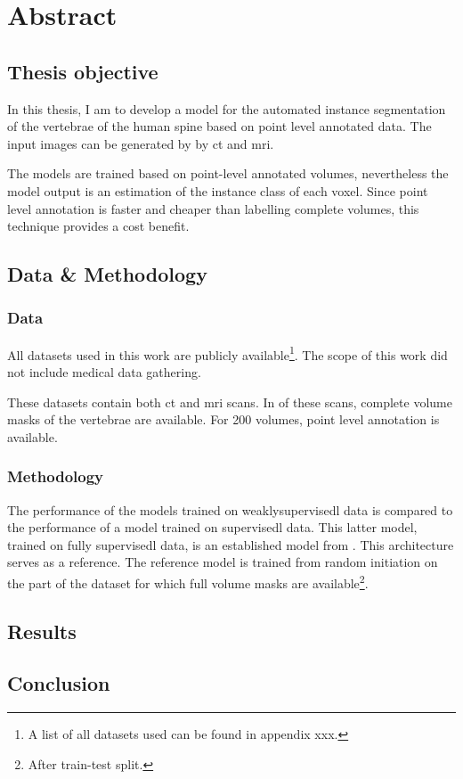 \chapter{Abstract}

\section{Thesis objective}
In this thesis, I am to develop a model for the automated instance segmentation of the vertebrae of the human spine based on point level annotated data.
The input images can be generated by by \acrfull{ct} and \acrfull{mri}.


The models are trained based on point-level annotated volumes, nevertheless the model output is an estimation of the instance class of each voxel.
Since point level annotation is faster and cheaper than labelling complete volumes, this technique provides a cost benefit. 

\section{Data \& Methodology}

\subsection{Data}
All datasets used in this work are publicly available\footnote{A list of all datasets used can be found in appendix xxx.}. 
The scope of this work did not include medical data gathering.

These datasets contain both \acrshort{ct} and \acrshort{mri} scans. 
In  of these scans, complete volume masks of the vertebrae are available. 
For 200 volumes, point level annotation is available.

\subsection{Methodology}
The performance of the models trained on \Gls{weaklysupervisedl} data is compared to the performance of a model trained on \Gls{supervisedl} data.
This latter model, trained on fully \Gls{supervisedl} data, is an established model from . 
This architecture serves as a reference.
The reference model is trained from random initiation on the part of the dataset for which full volume masks are available\footnote{After train-test split.}.  

\section{Results}

\section{Conclusion}
